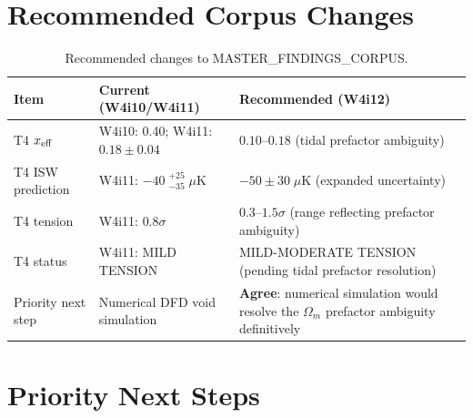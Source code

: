 \documentclass[11pt,a4paper]{article}
\newcommand{\Omm}{\Omega_m}
\begin{document}
\section{Recommended Corpus Changes}
\label{sec:corpus-changes}

\begin{table}[H]
\centering
\caption{Recommended changes to MASTER\_FINDINGS\_CORPUS.}
\begin{tabular}{p{3.5cm}p{4cm}p{4cm}}
\toprule
\textbf{Item} & \textbf{Current (W4i10/W4i11)} &
  \textbf{Recommended (W4i12)} \\
\midrule
T4 $x_{\rm eff}$ & W4i10: 0.40; W4i11: $0.18 \pm 0.04$ &
  $0.10$--$0.18$ (tidal prefactor ambiguity) \\
T4 ISW prediction & W4i11: $-40\;{}^{+25}_{-35}\;\mu$K &
  $-50 \pm 30\;\mu$K (expanded uncertainty) \\
T4 tension & W4i11: $0.8\sigma$ &
  $0.3$--$1.5\sigma$ (range reflecting prefactor ambiguity) \\
T4 status & W4i11: MILD TENSION & MILD-MODERATE TENSION
  (pending tidal prefactor resolution) \\
Priority next step & Numerical DFD void simulation &
  \textbf{Agree}: numerical simulation would resolve the
  $\Omm$ prefactor ambiguity definitively \\
\bottomrule
\end{tabular}
\end{table}


\section{Priority Next Steps}
\label{sec:next-steps}
\end{document}
